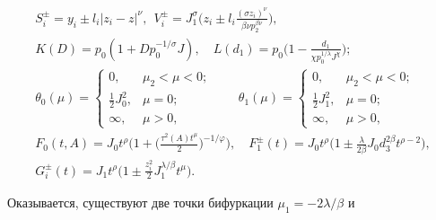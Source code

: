 \begin{gather*}
% 


S^\pm_i=y_i\pm l_i|z_i-z|^\nu,\ \ V^{\pm}_i=J^\sigma_1\bigg( 


z_i\pm l_i\frac{(\sigma z_i)^\nu}{\beta\nu p^{\beta\nu}_2} 


\bigg),\\ 


% 


K(D)=p_0(1+Dp^{-1/\sigma}_0J),\quad L(d_1)=p_0\bigg(1- 


\frac{d_1}{\chi p^{1/\lambda}_0J^\chi}\bigg);\\ 


% 


\theta_0(\mu)= 


\begin{cases} 


0, & \mu_2<\mu<0;\\ 


\frac{1}{2}J^2_0, & \mu=0;\\ 


\infty, & \mu>0, 


\end{cases} 


\qquad \theta_1(\mu)= 


\begin{cases} 


0, & \mu_2<\mu<0;\\ 


\frac{1}{2}J^2_1, & \mu=0;\\ 


\infty, & \mu>0, 


\end{cases} 


\\ 


% 


F_0(t,A)=J_0t^\rho\bigg(1+\bigg( 


\frac{\tau^2(A)t^\mu}{2}\bigg)^{-1/\varphi}\bigg),\quad 


F^\pm_1(t)=J_0t^\rho\bigg(1\pm\frac{\lambda}{2\beta} 


J_0d^{2\beta}_3t^{\rho-2}\bigg),\\ 


% 


G^\pm_i(t)=J_1t^\rho\bigg(1\pm\frac{z^2_i}{2} 


J^{\lambda/\beta}_1t^\mu\bigg). 


\end{gather*} 


Оказывается, существуют две точки бифуркации $\mu_1=-2\lambda/\beta$ и  


